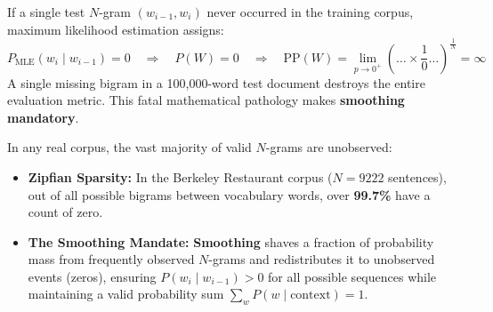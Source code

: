 \documentclass[10pt,a4paper]{article}
\begin{document}
\vspace{-2pt}

\begin{insightbox}[title={\bfseries\sffamily The Zero-Probability Breakdown: Why Smoothing is Mathematically Mandatory}]
\footnotesize
If a single test $N$-gram $(w_{i-1}, w_i)$ never occurred in the training corpus, maximum likelihood estimation assigns:
\[
P_{\text{MLE}}(w_i \mid w_{i-1}) = 0 \quad \Longrightarrow \quad P(W) = 0 \quad \Longrightarrow \quad \text{PP}(W) = \lim_{p \to 0^+} \left( \dots \times \frac{1}{0} \dots \right)^{\frac{1}{N}} = \boldsymbol{\infty}
\]
A single missing bigram in a 100,000-word test document destroys the entire evaluation metric. This fatal mathematical pathology makes \textbf{smoothing mandatory}.
\end{insightbox}

\newpage


\par\vspace{1pt}
In any real corpus, the vast majority of valid $N$-grams are unobserved:
\begin{itemize}[leftmargin=12pt, itemsep=0.5pt, parsep=0pt, topsep=0.5pt]
    \item \textbf{Zipfian Sparsity:} In the Berkeley Restaurant corpus ($N=9222$ sentences), out of all possible bigrams between vocabulary words, over \textbf{99.7\%} have a count of zero.
    \item \textbf{The Smoothing Mandate:} \textbf{Smoothing} shaves a fraction of probability mass from frequently observed $N$-grams and redistributes it to unobserved events (zeros), ensuring $P(w_i \mid w_{i-1}) > 0$ for all possible sequences while maintaining a valid probability sum $\sum_w P(w \mid \text{context}) = 1$.
\end{itemize}

\vspace{-2pt}
\end{document}
